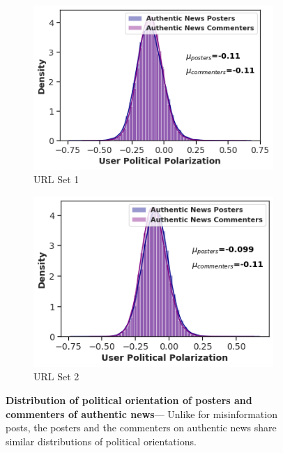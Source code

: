 \begin{figure}
\centering
\begin{subfigure}{.4\textwidth}
  \centering
\includegraphics[width=1\linewidth]{figures/news_posters_comenters_comparison.png}
    \caption{URL Set 1}
\end{subfigure}
\begin{subfigure}{.4\textwidth}
  \centering
\includegraphics[width=1\linewidth]{figures/news_posters_comenters_comparison2.png}
    \caption{URL Set 2}
\end{subfigure}
\caption{\textbf{Distribution of political orientation of posters and commenters of authentic news}--- Unlike for misinformation posts, the posters and the commenters on authentic news share similar distributions of political orientations.}
\label{figure:news-posters-commenters}
\end{figure}

